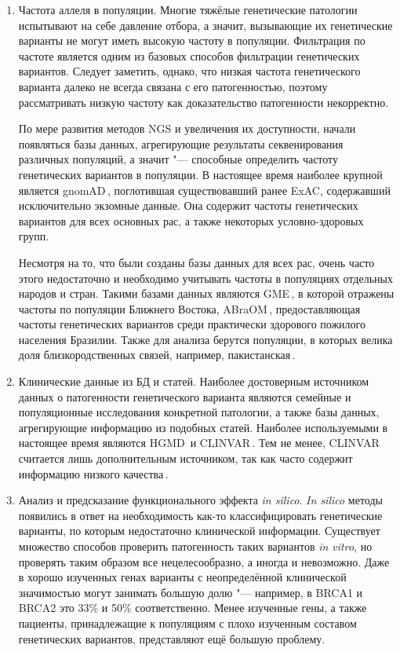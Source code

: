 \documentclass[a4paper,14pt]{extarticle}
\begin{document}
\begin{enumerate}
\item Частота аллеля в популяции.
Многие тяжёлые генетические патологии испытывают на себе давление отбора, а значит, вызывающие их генетические варианты не могут иметь высокую частоту в популяции.
Фильтрация по частоте является одним из базовых способов фильтрации генетических вариантов.
Следует заметить, однако, что низкая частота генетического варианта далеко не всегда связана с его патогенностью, поэтому рассматривать низкую частоту как доказательство патогенности некорректно.

По мере развития методов NGS и увеличения их доступности, начали появляться базы данных, агрегирующие результаты секвенирования различных популяций, а значит "--- способные определить частоту генетических вариантов в популяции.
В настоящее время наиболее крупной является gnomAD\,\cite{Karczewski_2020}, поглотившая существовавший ранее ExAC, содержавший исключительно экзомные данные.
Она содержит частоты генетических вариантов для всех основных рас, а также некоторых условно-здоровых групп.

Несмотря на то, что были созданы базы данных для всех рас, очень часто этого недостаточно и необходимо учитывать частоты в популяциях отдельных народов и стран.
Такими базами данных являются GME\,\cite{Scott_2016}, в которой отражены частоты по популяции Ближнего Востока, ABraOM\,\cite{Naslavsky_2017}, предоставляющая частоты генетических вариантов среди практически здорового пожилого населения Бразилии.
Также для анализа берутся популяции, в которых велика доля близкородственных связей, например, пакистанская\,\cite{Saleheen_2017}.

\item Клинические данные из БД и статей.
Наиболее достоверным источником данных о патогенности генетического варианта являются семейные и популяционные исследования конкретной патологии, а также базы данных, агрегирующие информацию из подобных статей.
Наиболее используемыми в настоящее время являются HGMD\,\cite{Stenson_2017} и CLINVAR\,\cite{Landrum_2017}.
Тем не менее, CLINVAR считается лишь дополнительным источником, так как часто содержит информацию низкого качества\,\cite{Ryzhkova_2017}.

\item Анализ и предсказание функционального эффекта \textit{in silico}.
\textit{In silico} методы появились в ответ на необходимость как-то классифицировать генетические варианты, по которым недостаточно клинической информации.
Существует множество способов проверить патогенность таких вариантов \textit{in vitro}, но проверять таким образом все нецелесообразно, а иногда и невозможно.
Даже в хорошо изученных генах варианты с неопределённой клинической значимостью могут занимать большую долю "--- например, в BRCA1 и BRCA2 это 33\% и 50\% соответственно.
Менее изученные гены, а также пациенты, принадлежащие к популяциям с плохо изученным составом генетических вариантов, представляют ещё большую проблему.


\end{enumerate}
\end{document}
